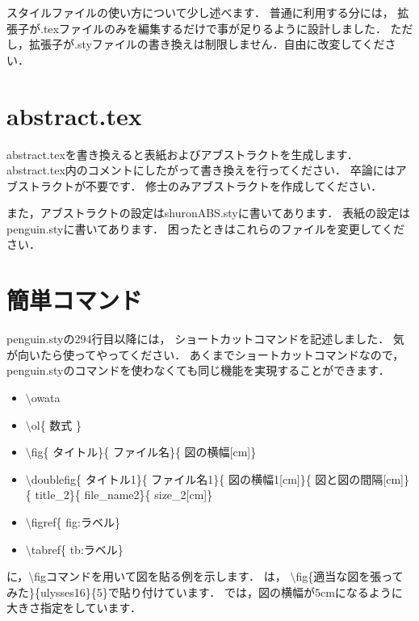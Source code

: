 スタイルファイルの使い方について少し述べます．
普通に利用する分には，
拡張子が.texファイルのみを編集するだけで事が足りるように設計しました．
ただし，拡張子が.styファイルの書き換えは制限しません．自由に改変してください．


\section{abstract.tex}
abstract.texを書き換えると表紙およびアブストラクトを生成します．
abstract.tex内のコメントにしたがって書き換えを行ってください．
卒論にはアブストラクトが不要です．
修士のみアブストラクトを作成してください．

また，アブストラクトの設定はshuronABS.styに書いてあります．
表紙の設定はpenguin.styに書いてあります．
困ったときはこれらのファイルを変更してください．

\section{簡単コマンド}

penguin.styの294行目以降には， ショートカットコマンドを記述しました．
気が向いたら使ってやってください．
あくまでショートカットコマンドなので，
penguin.styのコマンドを使わなくても同じ機能を実現することができます．

\begin{itemize}
\item $\setminus$owata
\item $\setminus$ol\{ 数式 \}
\item $\setminus$fig\{ タイトル\}\{ ファイル名\}\{ 図の横幅[cm]\}
\item $\setminus$doublefig\{ タイトル1\}\{ ファイル名1\}\{ 図の横幅1[cm]\}\{ 図と図の間隔[cm]\}\{ title\_2\}\{ file\_name2\}\{ size\_2[cm]\}
\item $\setminus$figref\{ fig:ラベル\}
\item $\setminus$tabref\{ tb:ラベル\}
\end{itemize}


に，$\setminus$figコマンドを用いて図を貼る例を示します．
は，
$\setminus$fig\{適当な図を張ってみた\}\{ulysses16\}\{5\}で貼り付けています．
では，図の横幅が5cmになるように大きさ指定をしています．


